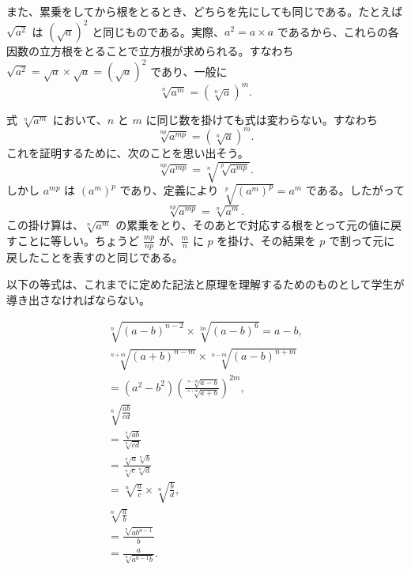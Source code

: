 \documentclass[a4paper,11pt,openany]{ltjsbook}
\begin{document}
また、累乗をしてから根をとるとき、どちらを先にしても同じである。たとえば $\sqrt{a^{2}}$ は $(\sqrt{a})^{2}$ と同じものである。実際、$a^{2} = a \times a$ であるから、これらの各因数の立方根をとることで立方根が求められる。すなわち $\sqrt{a^{2}} = \sqrt{a} \times \sqrt{a} = (\sqrt{a})^{2}$ であり、一般に
\[
\sqrt[n]{a^{m}} = (\sqrt[n]{a})^{m}.
\]

式 $\sqrt[n]{a^{m}}$ において、$n$ と $m$ に同じ数を掛けても式は変わらない。すなわち
\[
\sqrt[np]{a^{mp}} = (\sqrt[n]{a})^{m}.
\]
これを証明するために、次のことを思い出そう。
\[
\sqrt[np]{a^{mp}} = \sqrt[n]{\sqrt[p]{a^{mp}}}.
\]
しかし $a^{mp}$ は $(a^{m})^{p}$ であり、定義により $\sqrt[p]{(a^{m})^{p}} = a^{m}$ である。したがって
\[
\sqrt[np]{a^{mp}} = \sqrt[n]{a^{m}}.
\]
この掛け算は、$\sqrt[n]{a^{m}}$ の累乗をとり、そのあとで対応する根をとって元の値に戻すことに等しい。ちょうど $\frac{mp}{np}$ が、$\frac{m}{n}$ に $p$ を掛け、その結果を $p$ で割って元に戻したことを表すのと同じである。

以下の等式は、これまでに定めた記法と原理を理解するためのものとして学生が導き出さなければならない。

\begin{gather*}
\sqrt[n]{(a - b)^{n-2}} \times  \sqrt[3n]{(a - b)^{6}} = a - b, \\
\sqrt[n+m]{(a + b)^{n-m}} \times  \sqrt[n-m]{(a - b)^{n+m}} \\
  = (a^{2} - b^{2}) \left( \frac{\sqrt[n-m]{a - b}}{\sqrt[n+m]{a + b}}\right)^{2m}, \\
\sqrt[n]{\frac{ab}{cd}} \\
  = \frac{\sqrt[n]{ab}}{\sqrt[n]{cd}} \\
  = \frac{\sqrt[n]{a}\sqrt[n]{b}}{\sqrt[n]{c}\sqrt[n]{d}} \\
  = \sqrt[n]{\frac{a}{c}} \times  \sqrt[n]{\frac{b}{d}}, \\
\sqrt[n]{\frac{a}{b}} \\
  = \frac{\sqrt[n]{ab^{n-1}}}{b} \\
  = \frac{a}{\sqrt[n]{a^{n-1}b}}.
\end{gather*}
\end{document}
